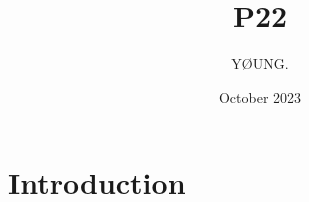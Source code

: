 \documentclass{article}
\title{P22}
\author{YØUNG. }
\date{October 2023}
\begin{document}
\maketitle

\section{Introduction}
\end{document}
